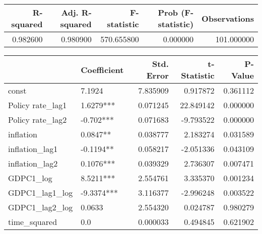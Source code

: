 \begin{tabular}{rrrrr}
\toprule
\textbf{R-squared} & \textbf{Adj. R-squared} & \textbf{F-statistic} & \textbf{Prob (F-statistic)} & \textbf{Observations} \\
\midrule
0.982600 & 0.980900 & 570.655800 & 0.000000 & 101.000000 \\
\bottomrule
\end{tabular}

\begin{tabular}{llrrr}
\toprule
 & \textbf{Coefficient} & \textbf{Std. Error} & \textbf{t-Statistic} & \textbf{P-Value} \\
\midrule
const & 7.1924 & 7.835909 & 0.917872 & 0.361112 \\
Policy rate_lag1 & 1.6279*** & 0.071245 & 22.849142 & 0.000000 \\
Policy rate_lag2 & -0.702*** & 0.071683 & -9.793522 & 0.000000 \\
inflation & 0.0847** & 0.038777 & 2.183274 & 0.031589 \\
inflation_lag1 & -0.1194** & 0.058217 & -2.051336 & 0.043109 \\
inflation_lag2 & 0.1076*** & 0.039329 & 2.736307 & 0.007471 \\
GDPC1_log & 8.5211*** & 2.554761 & 3.335370 & 0.001234 \\
GDPC1_lag1_log & -9.3374*** & 3.116377 & -2.996248 & 0.003522 \\
GDPC1_lag2_log & 0.0633 & 2.554320 & 0.024787 & 0.980279 \\
time_squared & 0.0 & 0.000033 & 0.494845 & 0.621902 \\
\bottomrule
\end{tabular}
